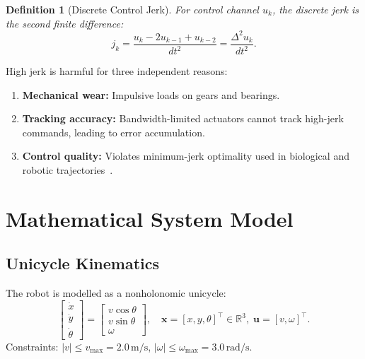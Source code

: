 \documentclass[12pt,a4paper,oneside]{report}
\newtheorem{definition}{Definition}[chapter]
\begin{document}
\begin{definition}[Discrete Control Jerk]
  For control channel \(u_k\), the discrete jerk is the second finite
  difference:
  \begin{equation}
    j_k = \frac{u_k - 2u_{k-1} + u_{k-2}}{dt^2} = \frac{\Delta^2 u_k}{dt^2}.
  \end{equation}
\end{definition}

High jerk is harmful for three independent reasons:
\begin{enumerate}
  \item \textbf{Mechanical wear:} Impulsive loads on gears and bearings.
  \item \textbf{Tracking accuracy:} Bandwidth-limited actuators cannot
    track high-jerk commands, leading to error accumulation.
  \item \textbf{Control quality:} Violates minimum-jerk optimality used
    in biological and robotic trajectories~\cite{flash1985}.
\end{enumerate}

\chapter{Mathematical System Model}\label{ch:model}

\section{Unicycle Kinematics}

The robot is modelled as a nonholonomic unicycle:
\begin{equation}\label{eq:kin}
  \begin{bmatrix}\dot{x}\\\dot{y}\\\dot{\theta}\end{bmatrix} =
  \begin{bmatrix}v\cos\theta\\v\sin\theta\\\omega\end{bmatrix},\quad
  \mathbf{x}=[x,y,\theta]^\top\in\mathbb{R}^3,\;
  \mathbf{u}=[v,\omega]^\top.
\end{equation}
Constraints: \(|v|\leq v_{\max}=2.0\,\text{m/s}\),
\(|\omega|\leq\omega_{\max}=3.0\,\text{rad/s}\).
\end{document}

